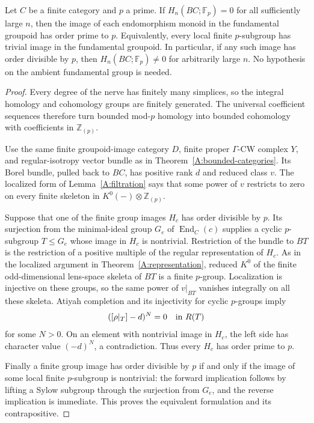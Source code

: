 \begin{corollary}
\label{A:bounded-categories-p}
Let $C$ be a finite category and $p$ a prime. If
$H_n(BC;\mathbb F_p)=0$ for all sufficiently large $n$, then the image of
each endomorphism monoid in the fundamental groupoid has order prime to
$p$. Equivalently, every local finite $p$-subgroup has trivial image in
the fundamental groupoid. In particular, if any such image has order
divisible by $p$, then $H_n(BC;\mathbb F_p)\ne0$ for arbitrarily large $n$.
No hypothesis on the ambient fundamental group is needed.
\end{corollary}
\begin{proof}
Every degree of the nerve has finitely many simplices, so the integral
homology and cohomology groups are finitely generated. The universal
coefficient sequences therefore turn bounded mod-$p$ homology into bounded
cohomology with coefficients in $\mathbb Z_{(p)}$.

Use the same finite groupoid-image category $D$, finite proper
$\Gamma$-CW complex $Y$, and regular-isotropy vector bundle as in
Theorem~\ref{A:bounded-categories}. Its Borel bundle, pulled back to $BC$,
has positive rank $d$ and reduced class $v$. The localized form of
Lemma~\ref{A:filtration} says that some power of $v$ restricts to zero
on every finite skeleton in $K^0(-)\otimes\mathbb Z_{(p)}$.

Suppose that one of the finite group images $H_c$ has order divisible
by $p$. Its surjection from the minimal-ideal group $G_e$ of
$\operatorname{End}_C(c)$ supplies a cyclic $p$-subgroup $T\le G_e$
whose image in $H_c$ is nontrivial. Restriction of the bundle to $BT$
is the restriction of a positive multiple of the regular representation
of $H_c$. As in the localized argument in
Theorem~\ref{A:representation}, reduced $K^0$ of the finite odd-dimensional
lens-space skeleta of $BT$ is a finite $p$-group. Localization is injective
on these groups, so the same power of $v|_{BT}$ vanishes integrally on
all these skeleta. Atiyah completion and its injectivity for cyclic
$p$-groups imply
\[
   ([\rho|_T]-d)^N=0\quad\hbox{in }R(T)
\]
for some $N>0$. On an element with nontrivial image in $H_c$, the left
side has character value $(-d)^N$, a contradiction. Thus every $H_c$
has order prime to $p$.

Finally a finite group image has order divisible by $p$ if and only if
the image of some local finite $p$-subgroup is nontrivial: the forward
implication follows by lifting a Sylow subgroup through the surjection
from $G_e$, and the reverse implication is immediate. This proves the
equivalent formulation and its contrapositive.
\end{proof}
